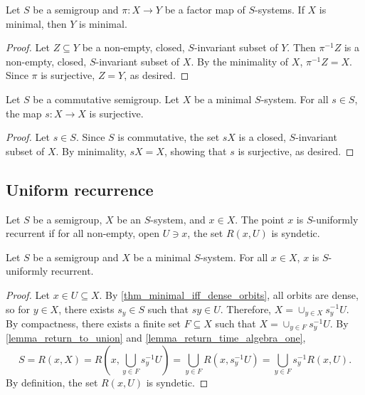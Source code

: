 \begin{lemma}
\label{lemma_img_of_min_is_min}
\leanok{}
    Let $S$ be a semigroup and $\pi: X \to Y$ be a factor map of $S$-systems. If $X$ is minimal, then $Y$ is minimal.
\end{lemma}

\begin{proof}
\leanok{}
    Let $Z \subseteq Y$ be a non-empty, closed, $S$-invariant subset of $Y$.  Then $\pi^{-1} Z$ is a non-empty, closed, $S$-invariant subset of $X$.  By the minimality of $X$, $\pi^{-1} Z = X$.  Since $\pi$ is surjective, $Z = Y$, as desired.
\end{proof}

\begin{lemma}
\label{lemma_minimal_comm_action_implies_surjective}
\leanok{}
    Let $S$ be a commutative semigroup.  Let $X$ be a minimal $S$-system.  For all $s \in S$, the map $s: X \to X$ is surjective.
\end{lemma}

\begin{proof}
\leanok{}
    Let $s \in S$.  Since $S$ is commutative, the set $sX$ is a closed, $S$-invariant subset of $X$.  By minimality, $sX = X$, showing that $s$ is surjective, as desired.
\end{proof}

\subsection{Uniform recurrence}

\begin{definition}
\label{def_uniformly_recurrent}
\leanok{}
    Let $S$ be a semigroup, $X$ be an $S$-system, and $x \in X$.  The point $x$ is $S$-uniformly recurrent if for all non-empty, open $U \ni x$, the set $R(x,U)$ is syndetic.
\end{definition}

\begin{lemma}
    \label{lemma_pts_in_minimal_are_ur}
    \leanok{}
    Let $S$ be a semigroup and $X$ be a minimal $S$-system. For all $x \in X$, $x$ is $S$-uniformly recurrent.
\end{lemma}

\begin{proof}
\leanok{}
    Let $x \in U \subseteq X$. By \cref{thm_minimal_iff_dense_orbits}, all orbits are dense, so for $y \in X$, there exists $s_y \in S$ such that $sy \in U$.  Therefore, $X = \cup_{y \in X} s_y^{-1}U$.  By compactness, there exists a finite set $F \subseteq X$ such that $X = \cup_{y \in F} s_y^{-1} U$.  By \cref{lemma_return_to_union} and \cref{lemma_return_time_algebra_one},
    \[S = R(x,X) = R(x, \bigcup_{y \in F} s_y^{-1} U ) = \bigcup_{y \in F} R(x, s_y^{-1} U) = \bigcup_{y \in F} s_y^{-1} R(x, U).\]
    By definition, the set $R(x,U)$ is syndetic.
\end{proof}


